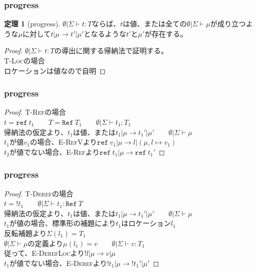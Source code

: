 \documentclass[dvipdfmx,cjk,xcolor=dvipsnames,envcountsect,notheorems]{beamer}
\theoremstyle{definition}
\newtheorem{theorem}{定理}
\newcommand{\REF}{\texttt{ref}}
\newcommand{\REFT}{\texttt{Ref}}
\begin{document}
\begin{frame}
	\frametitle{progress}
	\Large
	\renewcommand{\thetheorem}{13.5.7}
	\begin{theorem}[progress]
		$\emptyset | \Sigma \vdash t : T$ならば、$t$は値、または全ての$\emptyset | \Sigma \vdash \mu$が成り立つような$\mu$に対して$t|\mu\rightarrow t'|\mu'$となるような$t'$と$\mu'$が存在する。
	\end{theorem}
	\begin{proof}
		$\emptyset | \Sigma \vdash t : T$の導出に関する帰納法で証明する。\\
		\textsc{T-Loc}の場合\\
		ロケーションは値なので自明
	\end{proof}
\end{frame}

\begin{frame}
	\frametitle{progress}
	\Large
	\begin{proof}
		\textsc{T-Ref}の場合\\
		$t = \REF~t_1 \qquad T = \REFT~T_1 \qquad \emptyset | \Sigma \vdash t_1 : T_1$\\
		帰納法の仮定より、$t_1$は値、または$t_1|\mu\rightarrow t_1'|\mu' \qquad \emptyset | \Sigma \vdash \mu$\\
		$t_1$が値$v_1$の場合、\textsc{E-RefV}より$\REF~v_1 | \mu \rightarrow l | (\mu, l \mapsto v_1)$\\
		$t_2$が値でない場合、\textsc{E-Ref}より$\REF~t_1 | \mu \rightarrow \REF~t_1'$
	\end{proof}
\end{frame}

\begin{frame}
	\frametitle{progress}
	\Large
	\begin{proof}
		\textsc{T-Deref}の場合\\
		$t = !t_1 \qquad \emptyset | \Sigma \vdash t_1 : \REFT~T$\\
		帰納法の仮定より、$t_1$は値、または$t_1|\mu\rightarrow t_1'|\mu' \qquad \emptyset | \Sigma \vdash \mu$ \\
		$t_1$が値の場合、標準形の補題により$t_1$はロケーション$l_1$\\
		反転補題より$\Sigma(l_1)=T_1$\\
		$\emptyset | \Sigma \vdash \mu$の定義より$\mu(l_1)=v \qquad \emptyset | \Sigma \vdash v : T_1$\\
		従って、\textsc{E-DerefLoc}より$!l | \mu \rightarrow v | \mu$ \\
		$t_1$が値でない場合、\textsc{E-Deref}より$!t_1 | \mu \rightarrow !t_1' | \mu'$
	\end{proof}
\end{frame}
\end{document}
